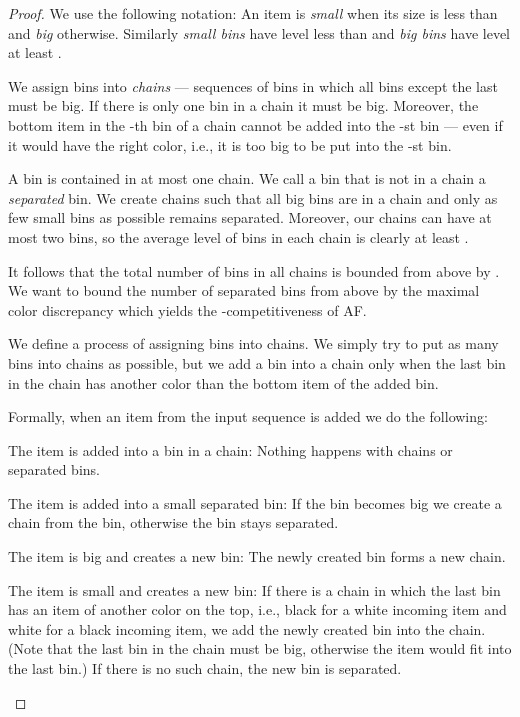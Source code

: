 \documentclass[11pt,a4paper]{article}
\begin{document}
\begin{proof}
We use the following notation: An item is \textit{small}
when its size is less than  and \textit{big} otherwise.
Similarly \textit{small bins} have level less than  and \textit{big bins} have level at least .

We assign bins into \textit{chains} --- sequences of bins in which all bins except the last must be big.
If there is only one bin in a chain it must be big.
Moreover, the bottom item in the -th bin of a chain cannot be added into the -st bin ---
even if it would have the right color, i.e., it is too big to be put into the -st bin.

A bin is contained in at most one chain. We call a bin that is not in a chain a \textit{separated} bin.
We create chains such that all big bins are in a chain and only as few small bins as possible remains separated.
Moreover, our chains can have at most two bins, so the average level
of bins in each chain is clearly at least .

It follows that the total number of bins in all chains
is bounded from above by .
We want to bound the number of separated bins from above by the maximal color discrepancy 
which yields the -competitiveness of AF.

We define a process of assigning bins into chains. 
We simply try to put as many bins into chains as possible,
but we add a bin into a chain only when the last bin
in the chain has another color than the bottom item of the added bin.

Formally, when an item from the input sequence is added we do the following:
\begin{compactitem}
\item The item is added into a bin in a chain: Nothing happens with chains or separated bins.
\item The item is added into a small separated bin: If the bin becomes big we create a chain from the bin,
otherwise the bin stays separated.
\item The item is big and creates a new bin: The newly created bin forms a new chain.
\item The item is small and creates a new bin:
If there is a chain in which the last bin has an item of another color on the top, i.e., black for a white incoming item and white for a black incoming item,
we add the newly created bin into the chain. (Note that the last bin in the chain must be big,
otherwise the item would fit into the last bin.)
If there is no such chain, the new bin is separated.
\end{compactitem}


\end{proof}
\end{document}
